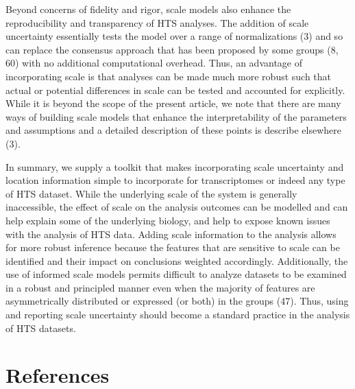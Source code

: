 \documentclass[
]{article}
\begin{document}
Beyond concerns of fidelity and rigor, scale models also enhance the
reproducibility and transparency of HTS analyses. The addition of scale
uncertainty essentially tests the model over a range of normalizations
(3) and so can replace the consensus approach that has been proposed by
some groups (8, 60) with no additional computational overhead. Thus, an
advantage of incorporating scale is that analyses can be made much more
robust such that actual or potential differences in scale can be tested
and accounted for explicitly. While it is beyond the scope of the
present article, we note that there are many ways of building scale
models that enhance the interpretability of the parameters and
assumptions and a detailed description of these points is describe
elsewhere (3).

In summary, we supply a toolkit that makes incorporating scale
uncertainty and location information simple to incorporate for
transcriptomes or indeed any type of HTS dataset. While the underlying
scale of the system is generally inaccessible, the effect of scale on
the analysis outcomes can be modelled and can help explain some of the
underlying biology, and help to expose known issues with the analysis of
HTS data. Adding scale information to the analysis allows for more
robust inference because the features that are sensitive to scale can be
identified and their impact on conclusions weighted accordingly.
Additionally, the use of informed scale models permits difficult to
analyze datasets to be examined in a robust and principled manner even
when the majority of features are asymmetrically distributed or
expressed (or both) in the groups (47). Thus, using and reporting scale
uncertainty should become a standard practice in the analysis of HTS
datasets.

\singlespacing

\section*{References}\label{references}
\end{document}
